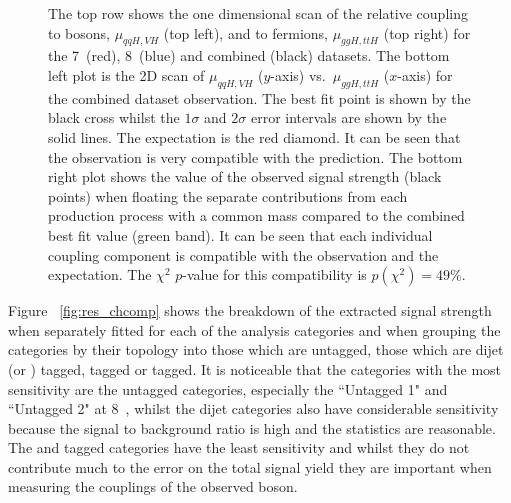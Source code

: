 \begin{figure}
  \caption[Observed best fit values and \NLL scans of the observed bosons couplings to fermions and bosons respectively]{The top row shows the one dimensional \NLL scan of the \SM relative coupling to bosons, $\mu_{qqH,VH}$ (top left), and to fermions, $\mu_{ggH,ttH}$ (top right) for the 7~\TeV (red), 8~\TeV (blue) and combined (black) datasets. The bottom left plot is the 2D \NLL scan of $\mu_{qqH,VH}$ ($y$-axis) vs.~$\mu_{ggH,ttH}$ ($x$-axis) for the combined dataset observation. The best fit point is shown by the black cross whilst the $1\sigma$ and $2\sigma$ error intervals are shown by the solid lines. The \SM expectation is the red diamond. It can be seen that the observation is very compatible with the \SM prediction. The bottom right plot shows the value of the observed signal strength (black points) when floating the separate contributions from each production process with a common mass compared to the combined best fit value (green band). It can be seen that each individual coupling component is compatible with the observation and the \SM expectation. The $\chi^{2}$ $p$-value for this compatibility is $p(\chi^{2})=49\%$.}
  \label{fig:res_rvrf}
\end{figure}

Figure ~\ref{fig:res_chcomp} shows the breakdown of the extracted signal strength when separately fitted for each of the analysis categories and when grouping the categories by their topology into those which are untagged, those which are dijet (or \VBF) tagged, \VH tagged or \ttH tagged. It is noticeable that the categories with the most sensitivity are the untagged categories, especially the ``Untagged 1" and ``Untagged 2" at 8~\TeV, whilst the dijet categories also have considerable sensitivity because the signal to background ratio is high and the statistics are reasonable. The \VH and \ttH tagged categories have the least sensitivity and whilst they do not contribute much to the error on the total signal yield they are important when measuring the couplings of the observed boson.

